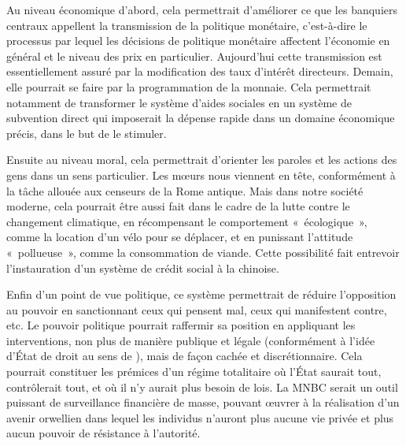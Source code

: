 Au niveau économique d'abord, cela permettrait d'améliorer ce que les banquiers centraux appellent la transmission de la politique monétaire, c'est-à-dire le processus par lequel les décisions de politique monétaire affectent l'économie en général et le niveau des prix en particulier. Aujourd'hui cette transmission est essentiellement assuré par la modification des taux d'intérêt directeurs. Demain, elle pourrait se faire par la programmation de la monnaie. Cela permettrait notamment de transformer le système d'aides sociales en un système de subvention direct qui imposerait la dépense rapide dans un domaine économique précis, dans le but de le stimuler.

Ensuite au niveau moral, cela permettrait d'orienter les paroles et les actions des gens dans un sens particulier. Les mœurs nous viennent en tête, conformément à la tâche allouée aux censeurs de la Rome antique. Mais dans notre société moderne, cela pourrait être aussi fait dans le cadre de la lutte contre le changement climatique, en récompensant le comportement «~écologique~», comme la location d'un vélo pour se déplacer, et en punissant l'attitude «~pollueuse~», comme la consommation de viande. Cette possibilité fait entrevoir l'instauration d'un système de crédit social à la chinoise.

Enfin d'un point de vue politique, ce système permettrait de réduire l'opposition au pouvoir en sanctionnant ceux qui pensent mal, ceux qui manifestent contre, etc. Le pouvoir politique pourrait raffermir sa position en appliquant les interventions, non plus de manière publique et légale (conformément à l'idée d'État de droit au sens de ), mais de façon cachée et discrétionnaire. Cela pourrait constituer les prémices d'un régime totalitaire où l'État saurait tout, contrôlerait tout, et où il n'y aurait plus besoin de lois. La MNBC serait un outil puissant de surveillance financière de masse, pouvant œuvrer à la réalisation d'un avenir orwellien dans lequel les individus n'auront plus aucune vie privée et plus aucun pouvoir de résistance à l'autorité.

